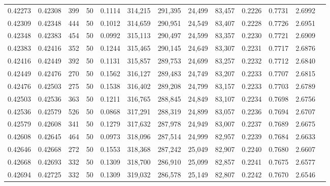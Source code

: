 \begin{tabular}{rrrrrrrrrrrrr}
0.42273 & 0.42308 &   399 &  50 &                                     0.1114 & 314,215 & 291,395 &  24,499 &  83,457 & 0.2226 & 0.7731 & 2.6992 \\
0.42309 & 0.42348 &   444 &  50 &                                     0.1012 & 314,659 & 290,951 &  24,549 &  83,407 & 0.2228 & 0.7726 & 2.6951 \\
0.42348 & 0.42383 &   454 &  50 &                                     0.0992 & 315,113 & 290,497 &  24,599 &  83,357 & 0.2230 & 0.7721 & 2.6909 \\
0.42383 & 0.42416 &   352 &  50 &                                     0.1244 & 315,465 & 290,145 &  24,649 &  83,307 & 0.2231 & 0.7717 & 2.6876 \\
0.42416 & 0.42449 &   392 &  50 &                                     0.1131 & 315,857 & 289,753 &  24,699 &  83,257 & 0.2232 & 0.7712 & 2.6840 \\
0.42449 & 0.42476 &   270 &  50 &                                     0.1562 & 316,127 & 289,483 &  24,749 &  83,207 & 0.2233 & 0.7707 & 2.6815 \\
0.42476 & 0.42503 &   275 &  50 &                                     0.1538 & 316,402 & 289,208 &  24,799 &  83,157 & 0.2233 & 0.7703 & 2.6789 \\
0.42503 & 0.42536 &   363 &  50 &                                     0.1211 & 316,765 & 288,845 &  24,849 &  83,107 & 0.2234 & 0.7698 & 2.6756 \\
0.42536 & 0.42579 &   526 &  50 &                                     0.0868 & 317,291 & 288,319 &  24,899 &  83,057 & 0.2236 & 0.7694 & 2.6707 \\
0.42579 & 0.42608 &   341 &  50 &                                     0.1279 & 317,632 & 287,978 &  24,949 &  83,007 & 0.2237 & 0.7689 & 2.6675 \\
0.42608 & 0.42645 &   464 &  50 &                                     0.0973 & 318,096 & 287,514 &  24,999 &  82,957 & 0.2239 & 0.7684 & 2.6633 \\
0.42646 & 0.42668 &   272 &  50 &                                     0.1553 & 318,368 & 287,242 &  25,049 &  82,907 & 0.2240 & 0.7680 & 2.6607 \\
0.42668 & 0.42693 &   332 &  50 &                                     0.1309 & 318,700 & 286,910 &  25,099 &  82,857 & 0.2241 & 0.7675 & 2.6577 \\
0.42694 & 0.42725 &   332 &  50 &                                     0.1309 & 319,032 & 286,578 &  25,149 &  82,807 & 0.2242 & 0.7670 & 2.6546 \\

\end{tabular}
